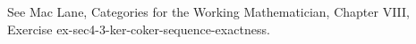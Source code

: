 See Mac Lane, Categories for the Working Mathematician, Chapter VIII, Exercise ex-sec4-3-ker-coker-sequence-exactness.
